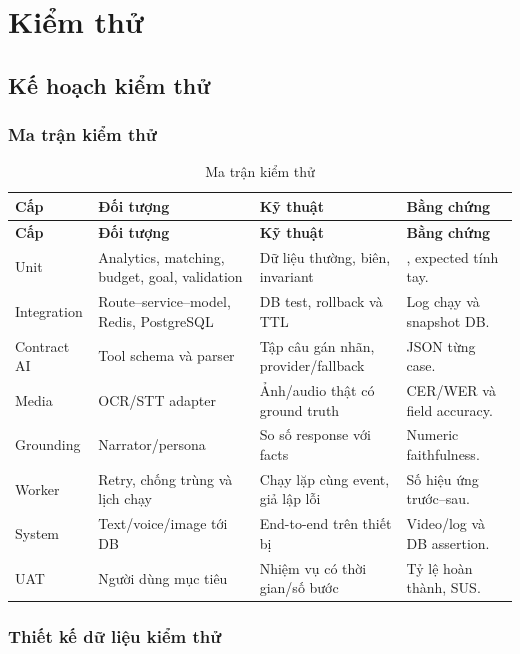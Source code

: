 \section{Kiểm thử}

\subsection{Kế hoạch kiểm thử}

\subsubsection{Ma trận kiểm thử}

\begin{longtable}{@{}L{2.1cm}L{3.5cm}L{3.5cm}L{3.5cm}@{}}
  \caption{Ma trận kiểm thử}\label{tab:test-matrix}\\
  \toprule
  \textbf{Cấp} & \textbf{Đối tượng} & \textbf{Kỹ thuật} & \textbf{Bằng chứng} \\
  \midrule
  \endfirsthead
  \toprule
  \textbf{Cấp} & \textbf{Đối tượng} & \textbf{Kỹ thuật} & \textbf{Bằng chứng} \\
  \midrule
  \endhead
  Unit & Analytics, matching, budget, goal, validation & Dữ liệu thường, biên, invariant & , expected tính tay. \\
  Integration & Route--service--model, Redis, PostgreSQL & DB test, rollback và TTL & Log chạy và snapshot DB. \\
  Contract AI & Tool schema và parser & Tập câu gán nhãn, provider/fallback & JSON từng case. \\
  Media & OCR/STT adapter & Ảnh/audio thật có ground truth & CER/WER và field accuracy. \\
  Grounding & Narrator/persona & So số response với facts & Numeric faithfulness. \\
  Worker & Retry, chống trùng và lịch chạy & Chạy lặp cùng event, giả lập lỗi & Số hiệu ứng trước--sau. \\
  System & Text/voice/image tới DB & End-to-end trên thiết bị & Video/log và DB assertion. \\
  UAT & Người dùng mục tiêu & Nhiệm vụ có thời gian/số bước & Tỷ lệ hoàn thành, SUS. \\
  \bottomrule
\end{longtable}

\subsubsection{Thiết kế dữ liệu kiểm thử}

